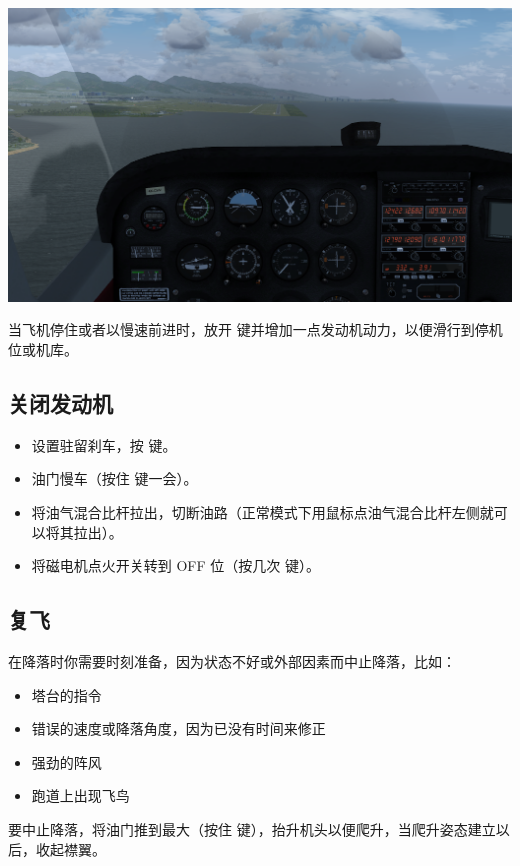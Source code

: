 \begin{itemize}
\centerline{
  \includegraphics[width=\textwidth]{img/basic_tutorial/landing}
}

当飞机停住或者以慢速前进时，放开  键并增加一点发动机动力，以便滑行到停机位或机库。

\subsection{关闭发动机}

\begin{itemize}
  \item 设置驻留刹车，按  键。
  \item 油门慢车（按住  键一会）。
  \item 将油气混合比杆拉出，切断油路（正常模式下用鼠标点油气混合比杆左侧就可以将其拉出）。
  \item 将磁电机点火开关转到 OFF 位（按几次 \key{\{} 键）。
\end{itemize}

\subsection{复飞}

在降落时你需要时刻准备，因为状态不好或外部因素而中止降落，比如：

\begin{itemize}
  \item 塔台的指令
  \item 错误的速度或降落角度，因为已没有时间来修正
  \item 强劲的阵风
  \item 跑道上出现飞鸟
\end{itemize}

要中止降落，将油门推到最大（按住  键），抬升机头以便爬升，当爬升姿态建立以后，收起襟翼。


\end{itemize}
